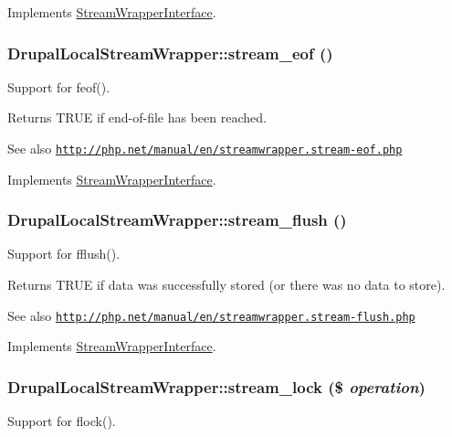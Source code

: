 Implements \hyperlink{interfaceStreamWrapperInterface}{StreamWrapperInterface}.\hypertarget{classDrupalLocalStreamWrapper_ad9167268d5bfa2e82356552136ebec7a}{
\subsubsection[{stream\_\-eof}]{\setlength{\rightskip}{0pt plus 5cm}DrupalLocalStreamWrapper::stream\_\-eof ()}}
\label{classDrupalLocalStreamWrapper_ad9167268d5bfa2e82356552136ebec7a}
Support for feof().

\begin{DoxyReturn}{Returns}
TRUE if end-\/of-\/file has been reached.
\end{DoxyReturn}
\begin{DoxySeeAlso}{See also}
\href{http://php.net/manual/en/streamwrapper.stream-eof.php}{\tt http://php.net/manual/en/streamwrapper.stream-\/eof.php} 
\end{DoxySeeAlso}


Implements \hyperlink{interfaceStreamWrapperInterface}{StreamWrapperInterface}.\hypertarget{classDrupalLocalStreamWrapper_ae0c67f28057a775ff795747bcb944aab}{
\subsubsection[{stream\_\-flush}]{\setlength{\rightskip}{0pt plus 5cm}DrupalLocalStreamWrapper::stream\_\-flush ()}}
\label{classDrupalLocalStreamWrapper_ae0c67f28057a775ff795747bcb944aab}
Support for fflush().

\begin{DoxyReturn}{Returns}
TRUE if data was successfully stored (or there was no data to store).
\end{DoxyReturn}
\begin{DoxySeeAlso}{See also}
\href{http://php.net/manual/en/streamwrapper.stream-flush.php}{\tt http://php.net/manual/en/streamwrapper.stream-\/flush.php} 
\end{DoxySeeAlso}


Implements \hyperlink{interfaceStreamWrapperInterface}{StreamWrapperInterface}.\hypertarget{classDrupalLocalStreamWrapper_afd5f70c60440f6ff3a837dd6eeb19b96}{
\subsubsection[{stream\_\-lock}]{\setlength{\rightskip}{0pt plus 5cm}DrupalLocalStreamWrapper::stream\_\-lock (\$ {\em operation})}}
\label{classDrupalLocalStreamWrapper_afd5f70c60440f6ff3a837dd6eeb19b96}
Support for flock().


